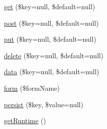 \begin{DoxyCompactItemize}
\item 
\hyperlink{classRequest_a07e525938b1a92175ffe01808e070ec8}{get} (\$key=null, \$default=null)
\item 
\hyperlink{classRequest_a5439c158517f97674d201dcfe5dad11d}{post} (\$key=null, \$default=null)
\item 
\hyperlink{classRequest_af523fe9032ce728bcb27156eae258c0d}{put} (\$key=null, \$default=null)
\item 
\hyperlink{classRequest_a4a342ba4c5656bb467e43605287a8e2a}{delete} (\$key=null, \$default=null)
\item 
\hyperlink{classRequest_ac6dea526aea1f35a9f939b4b768397d8}{data} (\$key=null, \$default=null)
\item 
\hyperlink{classRequest_a649c3866a95e9bde0f703cfbdaa528e8}{form} (\$formName)
\item 
\hyperlink{classRequest_a096cae394f50b2f9be98354272c2c32e}{persist} (\$key, \$value=null)
\item 
\hyperlink{classRequest_a134ffcd200dcc73daf24b378ca056ba7}{getRuntime} ()
\end{DoxyCompactItemize}
